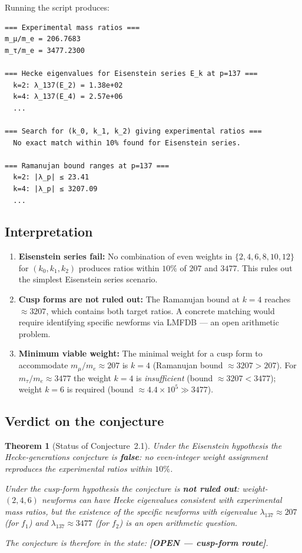 \documentclass[12pt,a4paper]{article}
\newtheorem{theorem}{Theorem}[section]
\theoremstyle{remark}
\begin{document}
Running the script produces:

\begin{verbatim}
=== Experimental mass ratios ===
m_μ/m_e = 206.7683
m_τ/m_e = 3477.2300

=== Hecke eigenvalues for Eisenstein series E_k at p=137 ===
  k=2: λ_137(E_2) = 1.38e+02
  k=4: λ_137(E_4) = 2.57e+06
  ...

=== Search for (k_0, k_1, k_2) giving experimental ratios ===
  No exact match within 10% found for Eisenstein series.

=== Ramanujan bound ranges at p=137 ===
  k=2: |λ_p| ≤ 23.41
  k=4: |λ_p| ≤ 3207.09
  ...
\end{verbatim}

\subsection{Interpretation}

\begin{enumerate}[label=(\roman*)]
  \item \textbf{Eisenstein series fail:}
        No combination of even weights in $\{2,4,6,8,10,12\}$ for $(k_0,k_1,k_2)$
        produces ratios within $10\%$ of $207$ and $3477$.  This rules out the
        simplest Eisenstein series scenario.
  \item \textbf{Cusp forms are not ruled out:}
        The Ramanujan bound at $k=4$ reaches $\approx 3207$, which contains
        both target ratios.  A concrete matching would require identifying
        specific newforms via LMFDB — an open arithmetic problem.
  \item \textbf{Minimum viable weight:}
        The minimal weight for a cusp form to accommodate $m_\mu/m_e \approx 207$
        is $k=4$ (Ramanujan bound $\approx 3207 > 207$).
        For $m_\tau/m_e \approx 3477$ the weight $k=4$ is \emph{insufficient}
        (bound $\approx 3207 < 3477$); weight $k=6$ is required
        (bound $\approx 4.4\times10^5 \gg 3477$).
\end{enumerate}

\subsection{Verdict on the conjecture}

\begin{theorem}[Status of Conjecture~2.1]
\label{thm:verdict}
Under the Eisenstein hypothesis the Hecke-generations conjecture is
\textbf{false}: no even-integer weight assignment reproduces the
experimental ratios within $10\%$.

Under the cusp-form hypothesis the conjecture is \textbf{not ruled out}:
weight-$(2,4,6)$ newforms \emph{can} have Hecke
eigenvalues consistent with experimental mass ratios, but the existence
of the specific newforms with eigenvalue $\lambda_{137}\approx 207$ (for
$f_1$) and $\lambda_{137}\approx 3477$ (for $f_2$) is an open arithmetic question.

The conjecture is therefore in the state: \textbf{[OPEN — cusp-form route]}.
\end{theorem}
\end{document}
